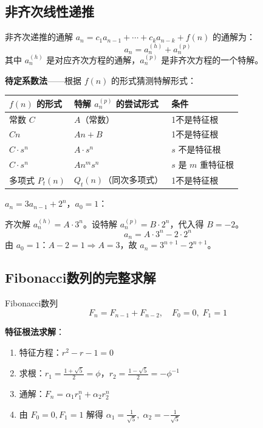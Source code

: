\subsection{非齐次线性递推}

\begin{myTheorem}{非齐次递推的通解}
\(a_n = c_1 a_{n-1} + \cdots + c_k a_{n-k} + f(n)\) 的通解为：
\[
a_n = a_n^{(h)} + a_n^{(p)}
\]
其中 \(a_n^{(h)}\) 是对应齐次方程的通解，\(a_n^{(p)}\) 是非齐次方程的一个特解。
\end{myTheorem}

\textbf{待定系数法}——根据 \(f(n)\) 的形式猜测特解形式：

\begin{table}[H]
\centering
\begin{tabular}{lll}
\toprule
\(f(n)\) 的形式 & 特解 \(a_n^{(p)}\) 的尝试形式 & 条件 \\
\midrule
常数 \(C\) & \(A\)（常数） & 1不是特征根 \\
\(Cn\) & \(An+B\) & 1不是特征根 \\
\(C\cdot s^n\) & \(A\cdot s^n\) & \(s\) 不是特征根 \\
\(C\cdot s^n\) & \(A n^m s^n\) & \(s\) 是 \(m\) 重特征根 \\
多项式 \(P_t(n)\) & \(Q_t(n)\)（同次多项式） & 1不是特征根 \\
\bottomrule
\end{tabular}
\end{table}

\begin{example}
\(a_n = 3a_{n-1} + 2^n\)，\(a_0 = 1\)：

齐次解 \(a_n^{(h)} = A\cdot 3^n\)。设特解 \(a_n^{(p)} = B\cdot 2^n\)，代入得 \(B=-2\)。
\[
a_n = A\cdot 3^n - 2\cdot 2^n
\]
由 \(a_0=1\)：\(A-2=1\Rightarrow A=3\)，故 \(a_n = 3^{n+1} - 2^{n+1}\)。
\end{example}

\subsection{Fibonacci数列的完整求解}

\begin{mydefinition}{Fibonacci数列}
\[
F_n = F_{n-1} + F_{n-2}, \quad F_0 = 0,\; F_1 = 1
\]
\end{mydefinition}

\textbf{特征根法求解}：
\begin{enumerate}
    \item 特征方程：\(r^2 - r - 1 = 0\)
    \item 求根：\(r_1 = \frac{1+\sqrt{5}}{2}=\phi\)，\(r_2 = \frac{1-\sqrt{5}}{2} = -\phi^{-1}\)
    \item 通解：\(F_n = \alpha_1 r_1^n + \alpha_2 r_2^n\)
    \item 由 \(F_0=0,F_1=1\) 解得 \(\alpha_1=\frac{1}{\sqrt{5}},\;\alpha_2=-\frac{1}{\sqrt{5}}\)
\end{enumerate}

